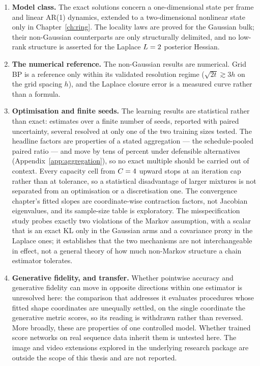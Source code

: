 \begin{enumerate}
  \item \textbf{Model class.} The exact solutions concern a one-dimensional
  state per frame and linear AR(1) dynamics, extended to a two-dimensional
  nonlinear state only in Chapter~\ref{ch:ring}. The locality laws are proved
  for the Gaussian bulk; their non-Gaussian counterparts are only structurally
  delimited, and no low-rank structure is asserted for the Laplace
  $L = 2$ posterior Hessian.

  \item \textbf{The numerical reference.} The non-Gaussian results are
  numerical. Grid BP is a reference only within its validated resolution regime
  ($\sqrt{2t} \gtrsim 3h$ on the grid spacing $h$), and the Laplace closure
  error is a measured curve rather than a formula.

  \item \textbf{Optimisation and finite seeds.} The learning results are
  statistical rather than exact: estimates over a finite number of seeds,
  reported with paired uncertainty, several resolved at only one of the two
  training sizes tested. The headline factors are properties of a stated
  aggregation --- the schedule-pooled paired ratio --- and move by tens of
  percent under defensible alternatives (Appendix~\ref{app:aggregation}), so
  no exact multiple should be carried out of context. Every capacity cell
  from $C = 4$ upward stops at
  an iteration cap rather than at tolerance, so a statistical disadvantage of
  larger mixtures is not separated from an optimisation or a discretisation one.
  The convergence chapter's fitted slopes are coordinate-wise contraction
  factors, not Jacobian eigenvalues, and its sample-size table is exploratory.
  The misspecification study probes exactly two violations of the Markov
  assumption, with a scalar that is an exact KL only in the Gaussian arms and
  a covariance proxy in the Laplace ones; it establishes that the two
  mechanisms are not interchangeable in effect, not
  a general theory of how much non-Markov structure a chain estimator tolerates.

  \item \textbf{Generative fidelity, and transfer.} Whether pointwise accuracy
  and generative fidelity can move in opposite directions within one estimator
  is unresolved here: the comparison that addresses it evaluates procedures
  whose fitted shape coordinates are unequally settled, on the single coordinate
  the generative metric scores, so its reading is withdrawn rather than
  reversed. More broadly, these are properties of one controlled model. Whether
  trained score networks on real sequence data inherit them is untested here.
  The image and video extensions explored in the underlying research package are
  outside the scope of this thesis and are not reported.
\end{enumerate}

